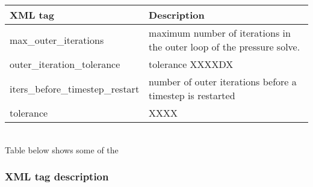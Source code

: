 %
\noindent
\footnotesize
\begin{tabular}{l p{8cm}}
XML tag &  Description\\
\hline
\hline
max\_outer\_iterations           &  maximum number of iterations in the outer loop of the pressure solve.\\
outer\_iteration\_tolerance      &  tolerance XXXXDX\\
iters\_before\_timestep\_restart &  \footnotesize number of outer iterations before a timestep is restarted\\
tolerance                        &   XXXX\\
\hline
\end{tabular}
\normalsize\\
%
Table below shows some of the

\normalsize
\subsubsection{XML tag description}




